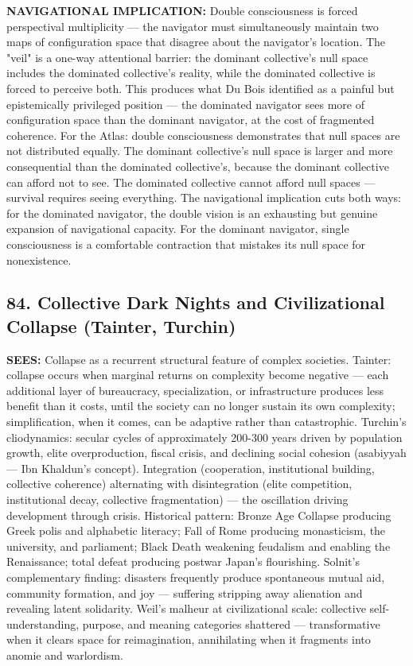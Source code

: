 \textbf{NAVIGATIONAL IMPLICATION:} Double consciousness is forced perspectival multiplicity — the navigator must simultaneously maintain two maps of configuration space that disagree about the navigator's location. The "veil" is a one-way attentional barrier: the dominant collective's null space includes the dominated collective's reality, while the dominated collective is forced to perceive both. This produces what Du Bois identified as a painful but epistemically privileged position — the dominated navigator sees more of configuration space than the dominant navigator, at the cost of fragmented coherence. For the Atlas: double consciousness demonstrates that null spaces are not distributed equally. The dominant collective's null space is larger and more consequential than the dominated collective's, because the dominant collective can afford not to see. The dominated collective cannot afford null spaces — survival requires seeing everything. The navigational implication cuts both ways: for the dominated navigator, the double vision is an exhausting but genuine expansion of navigational capacity. For the dominant navigator, single consciousness is a comfortable contraction that mistakes its null space for nonexistence.


\bigskip\noindent\makebox[\textwidth]{\color{rulegray}\rule{5cm}{0.3pt}}\bigskip


\subsection*{84. Collective Dark Nights and Civilizational Collapse (Tainter, Turchin)}


\textbf{SEES:} Collapse as a recurrent structural feature of complex societies. Tainter: collapse occurs when marginal returns on complexity become negative — each additional layer of bureaucracy, specialization, or infrastructure produces less benefit than it costs, until the society can no longer sustain its own complexity; simplification, when it comes, can be adaptive rather than catastrophic. Turchin's cliodynamics: secular cycles of approximately 200-300 years driven by population growth, elite overproduction, fiscal crisis, and declining social cohesion (asabiyyah — Ibn Khaldun's concept). Integration (cooperation, institutional building, collective coherence) alternating with disintegration (elite competition, institutional decay, collective fragmentation) — the oscillation driving development through crisis. Historical pattern: Bronze Age Collapse producing Greek polis and alphabetic literacy; Fall of Rome producing monasticism, the university, and parliament; Black Death weakening feudalism and enabling the Renaissance; total defeat producing postwar Japan's flourishing. Solnit's complementary finding: disasters frequently produce spontaneous mutual aid, community formation, and joy — suffering stripping away alienation and revealing latent solidarity. Weil's malheur at civilizational scale: collective self-understanding, purpose, and meaning categories shattered — transformative when it clears space for reimagination, annihilating when it fragments into anomie and warlordism.


